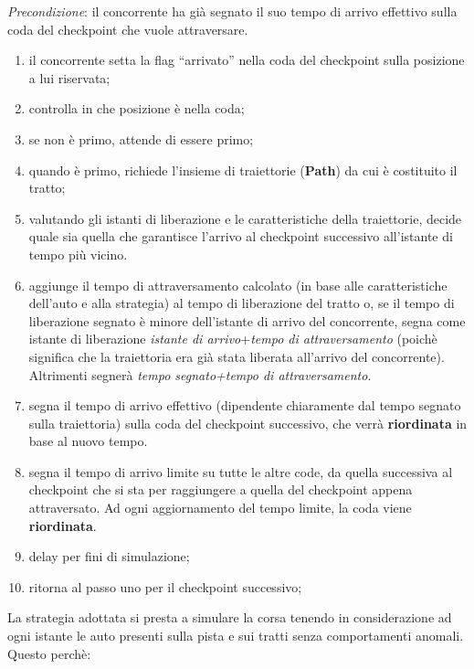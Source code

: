 \emph{Precondizione}: il concorrente ha gi\`{a} segnato il suo tempo di arrivo
effettivo sulla coda del checkpoint che vuole attraversare.
\begin{enumerate}
\item il concorrente setta la flag ``arrivato'' nella coda del checkpoint sulla
posizione a lui riservata;
\item controlla in che posizione \`{e} nella coda;
\item se non \`{e} primo, attende di essere primo;
\item quando \`{e} primo, richiede l'insieme di traiettorie (\textbf{Path}) da
cui \`{e} costituito il tratto;
\item valutando gli istanti di liberazione e le caratteristiche della
traiettorie, 
decide quale sia quella che garantisce l'arrivo al checkpoint
successivo all'istante di tempo pi\`{u} vicino.
\item aggiunge il tempo di attraversamento calcolato (in base alle
caratteristiche dell'auto e alla strategia) 
al tempo di liberazione del tratto o, 
se il tempo di liberazione segnato \`{e} minore dell'istante di arrivo del
concorrente, 
segna come istante di liberazione \emph{istante di arrivo}+\emph{tempo
di attraversamento} (poich\`{e} significa che la traiettoria era gi\`{a} stata
liberata all'arrivo del concorrente). Altrimenti segnerà \emph{tempo
segnato+tempo di attraversamento}.
\item segna il tempo di arrivo effettivo (dipendente chiaramente dal tempo
segnato sulla traiettoria) sulla coda del checkpoint successivo, che verr\`{a}
\textbf{riordinata} in base al nuovo tempo.
\item segna il tempo di arrivo limite su tutte le altre code, da quella
successiva al checkpoint che si sta per raggiungere a quella del checkpoint
appena attraversato. Ad ogni aggiornamento del tempo limite, la coda viene
\textbf{riordinata}.
\item delay per fini di simulazione;
\item ritorna al passo uno per il checkpoint successivo;
\end{enumerate}
La strategia adottata si presta a simulare la corsa tenendo in considerazione ad
ogni istante le auto presenti sulla pista e sui tratti senza comportamenti
anomali. Questo perch\`{e}:
